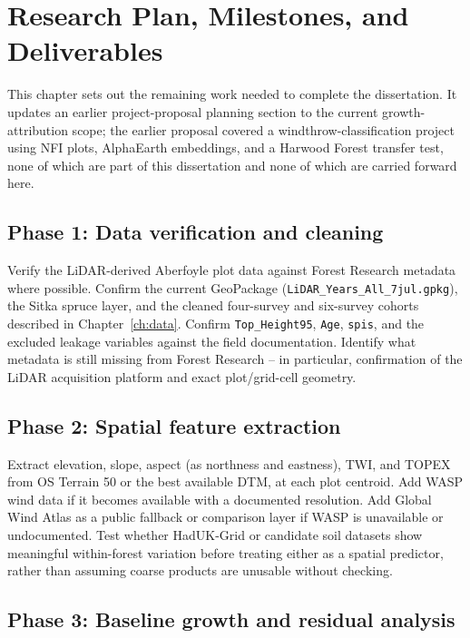\chapter{Research Plan, Milestones, and Deliverables}
\label{ch:research-plan}

This chapter sets out the remaining work needed to complete the dissertation. It updates an earlier project-proposal planning section to the current growth-attribution scope; the earlier proposal covered a windthrow-classification project using NFI plots, AlphaEarth embeddings, and a Harwood Forest transfer test, none of which are part of this dissertation and none of which are carried forward here.

\section{Phase 1: Data verification and cleaning}

Verify the LiDAR-derived Aberfoyle plot data against Forest Research metadata where possible. Confirm the current GeoPackage (\texttt{LiDAR\_Years\_All\_7jul.gpkg}), the Sitka spruce layer, and the cleaned four-survey and six-survey cohorts described in Chapter~\ref{ch:data}. Confirm \texttt{Top\_Height95}, \texttt{Age}, \texttt{spis}, and the excluded leakage variables against the field documentation. Identify what metadata is still missing from Forest Research -- in particular, confirmation of the LiDAR acquisition platform and exact plot/grid-cell geometry.

\section{Phase 2: Spatial feature extraction}

Extract elevation, slope, aspect (as northness and eastness), TWI, and TOPEX from OS Terrain 50 or the best available DTM, at each plot centroid. Add WASP wind data if it becomes available with a documented resolution. Add Global Wind Atlas as a public fallback or comparison layer if WASP is unavailable or undocumented. Test whether HadUK-Grid or candidate soil datasets show meaningful within-forest variation before treating either as a spatial predictor, rather than assuming coarse products are unusable without checking.

\section{Phase 3: Baseline growth and residual analysis}

